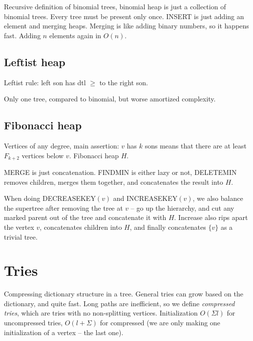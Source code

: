 Recursive definition of binomial trees, binomial heap is just a collection of
binomial trees. Every tree must be present only once. INSERT is just adding
an element and merging heaps. Merging is like adding binary numbers, so it happens
fast. Adding $n$ elements again in $O(n)$.

\subsection{Leftist heap}


Leftist rule: left son has dtl $≥$ to the right son.

Only one tree, compared to binomial, but worse amortized complexity.

\subsection{Fibonacci heap}

Vertices of any degree, main assertion: $v$ has $k$ sons means that there are
at least $F_{k+2}$ vertices below $v$. Fibonacci heap $H$.

MERGE is just concatenation. FINDMIN is either lazy or not, DELETEMIN removes
children, merges them together, and concatenates the result into $H$.

When doing DECREASEKEY$(v)$ and INCREASEKEY$(v)$, we also balance the
supertree after removing the tree at $v$ -- go up the hierarchy, and
cut any marked parent out of the tree and concatenate it with
$H$. Increase also rips apart the vertex $v$, concatenates children
into $H$, and finally concatenates $\{v\}$ as a trivial tree.

\section{Tries}

Compressing dictionary structure in a tree. General tries can grow
based on the dictionary, and quite fast. Long paths are inefficient,
so we define {\it compressed tries}, which are tries with no
non-splitting vertices. Initialization $O(Σl)$ for uncompressed tries,
$O(l + Σ)$ for compressed (we are only making one initialization of a
vertex -- the last one).


